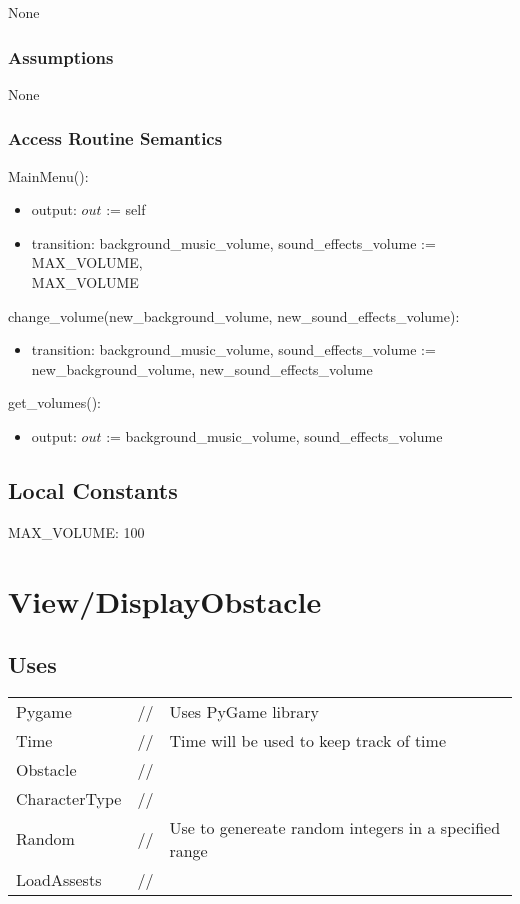 \documentclass[12pt]{article}
\begin{document}
None

\subsubsection* {Assumptions}

None

\subsubsection* {Access Routine Semantics}

MainMenu():
\begin{itemize}
    \item output: $out$ := self
    \item transition: background\_music\_volume, sound\_effects\_volume := MAX\_VOLUME, \\ MAX\_VOLUME
\end{itemize}
\noindent change\_volume(new\_background\_volume, new\_sound\_effects\_volume):
\begin{itemize}
    \item transition: background\_music\_volume, sound\_effects\_volume := new\_background\_volume, new\_sound\_effects\_volume
\end{itemize}
\noindent get\_volumes():
\begin{itemize}
    \item output: $out$ := background\_music\_volume, sound\_effects\_volume 
\end{itemize}
\subsection* {Local Constants}
MAX\_VOLUME: 100

\newpage

\section*{View/DisplayObstacle}

\subsection* {Uses}

\begin{tabular}{lll}
    Pygame & // & Uses PyGame library\\
    Time & // & Time will be used to keep track of time\\
    Obstacle & // & \\
    CharacterType & // & \\
    Random & // & Use to genereate random integers in a specified range\\
    LoadAssests & // & \\
\end{tabular}
\end{document}

